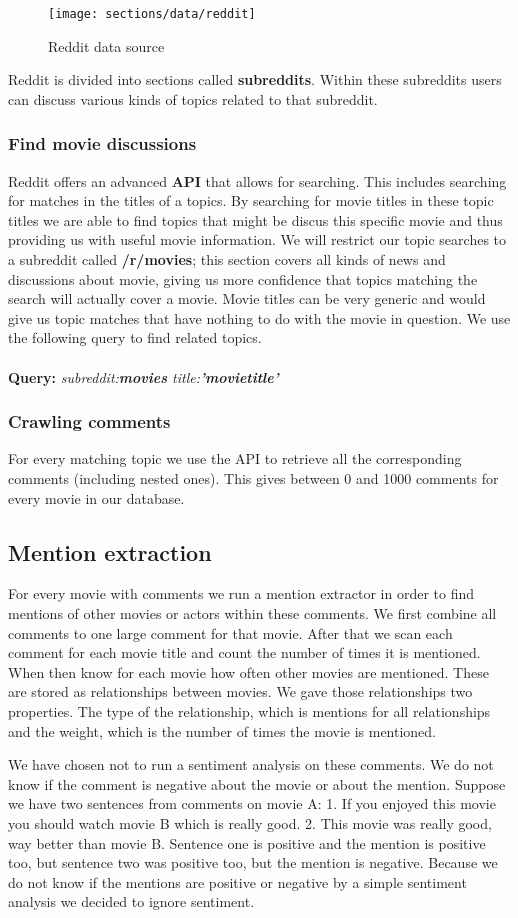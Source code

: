 \begin{figure}[H]
	\centering
	\texttt{[image: sections/data/reddit]}
	\caption{Reddit data source}
\end{figure}

Reddit is divided into sections called \textbf{subreddits}. 
Within these subreddits users can discuss various kinds of topics related to that subreddit.  

\subsubsection{Find movie discussions}
Reddit offers an advanced \textbf{API} that allows for searching. This includes searching for matches in the titles of a topics. By searching for movie titles in these topic titles we are able to find topics that might be discus this specific movie and thus providing us with useful movie information. We will restrict our topic searches to a subreddit called \textbf{/r/movies}; this section covers all kinds of news and discussions about movie, giving us more confidence that topics matching the search will actually cover a movie. Movie titles can be very generic and would give us topic matches that have nothing to do with the movie in question. We use the following query to find related topics.
\\
\\
\textbf{Query:} \emph{subreddit:\textbf{movies} title:\textbf{'movietitle'}}

\subsubsection{Crawling comments}
For every matching topic we use the API to retrieve all the corresponding comments (including nested ones). 
This gives between 0 and 1000 comments for every movie in our database.

\subsection{Mention extraction}
For every movie with comments we run a mention extractor in order to find mentions of other movies or actors within these comments.
We first combine all comments to one large comment for that movie. 
After that we scan each comment for each movie title and count the number of times it is mentioned.
When then know for each movie how often other movies are mentioned.
These are stored as relationships between movies.
We gave those relationships two properties. 
The type of the relationship, which is mentions for all relationships and the weight, which is the number of times the movie is mentioned.

We have chosen not to run a sentiment analysis on these comments. 
We do not know if the comment is negative about the movie or about the mention.
Suppose we have two sentences from comments on movie A: 
1. If you enjoyed this movie you should watch movie B which is really good. 
2. This movie was really good, way better than movie B.
Sentence one is positive and the mention is positive too, but sentence two was positive too, but the mention is negative. 
Because we do not know if the mentions are positive or negative by a simple sentiment analysis we decided to ignore sentiment. 